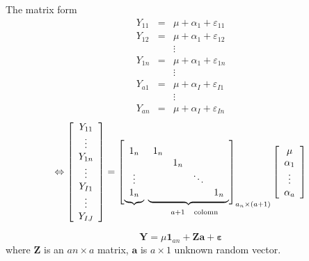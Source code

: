 \documentclass{article}
\begin{document}
The matrix form%
\begin{eqnarray*}
Y_{11} &=&\mu +\alpha _{1}+\varepsilon _{11} \\
Y_{12} &=&\mu +\alpha _{1}+\varepsilon _{12} \\
&&\vdots \\
Y_{1n} &=&\mu +\alpha _{1}+\varepsilon _{1n} \\
&&\vdots \\
Y_{a1} &=&\mu +\alpha _{I}+\varepsilon _{I1} \\
&&\vdots \\
Y_{an} &=&\mu +\alpha _{I}+\varepsilon _{In}
\end{eqnarray*}%
\begin{equation*}
\Leftrightarrow \left[ 
\begin{array}{c}
Y_{11} \\ 
\vdots \\ 
Y_{1n} \\ 
\vdots \\ 
Y_{I1} \\ 
\vdots \\ 
Y_{IJ}%
\end{array}%
\right] =\underset{a+1\text{ colomn}}{\left[ \underbrace{%
\begin{array}{c}
1_{n} \\ 
\\ 
\vdots \\ 
1_{n}%
\end{array}%
}\right. \left. \underbrace{%
\begin{array}{cccc}
1_{n} &  &  &  \\ 
& 1_{n} &  &  \\ 
&  & \ddots &  \\ 
&  &  & 1_{n}%
\end{array}%
}\right] _{a_{n}\times \left( a+1\right) }}\left[ 
\begin{array}{c}
\mu \\ 
\alpha _{1} \\ 
\vdots \\ 
\alpha _{a}%
\end{array}%
\right]
\end{equation*}

\bigskip

\begin{equation*}
\mathbf{Y}=\mu \boldsymbol{1}_{an}+\mathbf{Za+\varepsilon }
\end{equation*}%
where $\mathbf{Z}$ is an $an\times a$ matrix, $\mathbf{a}$ is $a\times 1$
unknown random vector.
\end{document}
